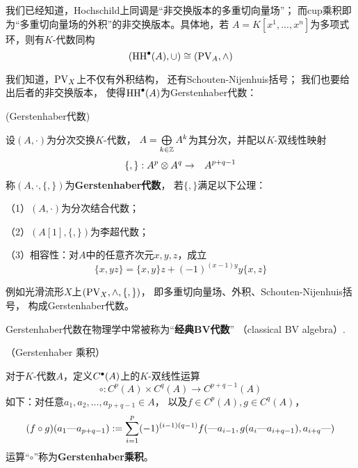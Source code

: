 \begin{rem}%
我们已经知道，Hochschild上同调是“非交换版本的多重切向量场”；
而cup乘积即为“多重切向量场的外积”的非交换版本。具体地，若
$A=K[x^1,...,x^n]$为多项式环，则有$K$-代数同构
$$(\operatorname{HH}^{\bullet}(A),\cup)\cong (\operatorname{PV}_A,\wedge)$$
\end{rem}

我们知道，$\operatorname{PV}_X$上不仅有外积结构，
还有Schouten-Nijenhuis括号；
我们也要给出后者的非交换版本，
使得$\operatorname{HH}^{\bullet}(A)$为Gerstenhaber代数：

\begin{definition}(Gerstenhaber代数)

设$(A,\cdot)$为分次交换$K$-代数，
$A=\bigoplus\limits_{k\in\mathbb{Z}}A^k$为其分次，并配以$K$-双线性映射
\begin{eqnarray*}
\{,\}:A^p\otimes A^q&\to& A^{p+q-1}
\end{eqnarray*}
称$(A,\cdot,\{,\})$为\textbf{Gerstenhaber代数}，
若$\{,\}$满足以下公理：

（1）$(A,\cdot)$为分次结合代数；

（2）$(A[1],\{,\})$为李超代数；

（3）相容性：对$A$中的任意齐次元$x,y,z$，成立
$$\{x,yz\}=\{x,y\}z+(-1)^{(x-1)y}y\{x,z\}$$
\end{definition}
例如光滑流形$X$上$(\operatorname{PV}_X,\wedge,\{,\})$，
即多重切向量场、外积、Schouten-Nijenhuis括号，
构成Gerstenhaber代数。

Gerstenhaber代数在物理学中常被称为“\textbf{经典BV代数}”
（classical BV algebra）.



\begin{definition}（Gerstenhaber 乘积）

对于$K$-代数$A$，定义$C^{\bullet}(A)$上的$K$-双线性运算
$$\circ:C^{p}(A)\times C^q(A)\to C^{p+q-1}(A)$$
如下：对任意$a_1,a_2,...,a_{p+q-1}\in A$，
以及$f\in C^p(A),g\in C^q(A)$，
$$(f\circ g)(a_1\text{---} a_{p+q-1})
:=\sum_{i=1}^p(-1)^{(i-1)(q-1)}
    f(\text{---} a_{i-1},g(a_i\text{---} a_{i+q-1}),a_{i+q}\text{---})$$
运算“$\circ$”称为\textbf{Gerstenhaber乘积}。
\end{definition}

